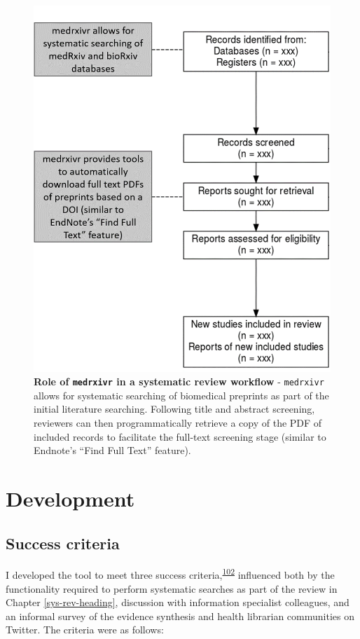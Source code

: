 \documentclass[a4paper, twoside]{templates/ociamthesis}
\begin{document}
\begin{figure}

{\centering \includegraphics[width=0.65\linewidth]{figures/sys-rev-tools/medrxiv-role} 

}

\caption[Role of \texttt{medrxivr} in a systematic review workflow]{\textbf{Role of \texttt{medrxivr} in a systematic review workflow} - \texttt{medrxivr} allows for systematic searching of biomedical preprints as part of the initial literature searching. Following title and abstract screening, reviewers can then programmatically retrieve a copy of the PDF of included records to facilitate the full-text screening stage (similar to Endnote's ``Find Full Text'' feature).}\label{fig:medrxivr-sr}
\end{figure}

\hypertarget{development}{%
\section{Development}\label{development}}

\hypertarget{success-criteria}{%
\subsection{Success criteria}\label{success-criteria}}

I developed the tool to meet three success criteria,\textsuperscript{\protect\hyperlink{ref-wateridge1995}{102}} influenced both by the functionality required to perform systematic searches as part of the review in Chapter \ref{sys-rev-heading}, discussion with information specialist colleagues, and an informal survey of the evidence synthesis and health librarian communities on Twitter. The criteria were as follows:
\end{document}
